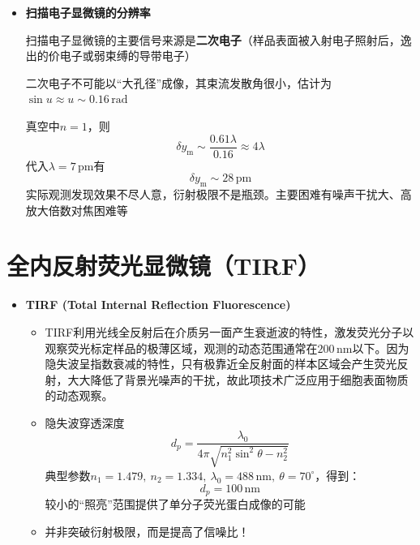 \documentclass[10pt]{beamer}
\newenvironment{slide}{
    \begin{frame}{\bfseries{\sectiontitle}}
}{
    \end{frame}
}
\let\sectiononly\section
\renewcommand{\section}[1]{
    \sectiononly{#1}
    \let\sectiontitle\relax
    \newcommand{\sectiontitle}{#1}
}
\begin{document}
\begin{slide}
    \begin{itemize}
    \item \textbf{扫描电子显微镜的分辨率}

    扫描电子显微镜的主要信号来源是\textbf{二次电子}（样品表面被入射电子照射后，逸出的价电子或弱束缚的导带电子）

    二次电子不可能以“大孔径”成像，其束流发散角很小，估计为$\sin{u}\approx u\sim0.16\,\mathrm{rad}$

    真空中$n = 1$，则
    \[
        \delta y_{\mathrm{m}} \sim \frac{0.61\lambda}{0.16} \approx 4\lambda
    \]
    代入$\lambda = 7\,\mathrm{pm}$有
    \[
    \boxed{\delta y_{\mathrm{m}} \sim 28\,\mathrm{pm}}
    \]
    实际观测发现效果不尽人意，衍射极限不是瓶颈。主要困难有噪声干扰大、高放大倍数对焦困难等
    \end{itemize}
\end{slide}

\section{全内反射荧光显微镜（TIRF）}

\begin{slide}
    \begin{itemize}
    \item \textbf{TIRF (Total Internal Reflection Fluorescence)}
        \begin{itemize}
            \item TIRF利用光线全反射后在介质另一面产生衰逝波的特性，激发荧光分子以观察荧光标定样品的极薄区域，观测的动态范围通常在$200\,\mathrm{nm}$以下。因为隐失波呈指数衰减的特性，只有极靠近全反射面的样本区域会产生荧光反射，大大降低了背景光噪声的干扰，故此项技术广泛应用于细胞表面物质的动态观察。

            \item 隐失波穿透深度
            \[
                d_p = \frac{\lambda_0}{4\pi\sqrt{n_1^2\sin^2\theta - n_2^2}}
            \]
            典型参数$n_1 = 1.479,\ n_2 = 1.334,\ \lambda_0 = 488\,\mathrm{nm},\ \theta = 70^\circ$，得到：
            \[
            \boxed{d_p = 100\,\mathrm{nm}}
            \]
            较小的“照亮”范围提供了单分子荧光蛋白成像的可能

            \item 并非突破衍射极限，而是提高了信噪比！
        \end{itemize}
    \end{itemize}
\end{slide}
\end{document}
